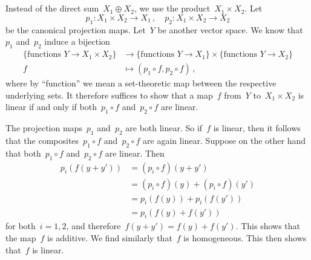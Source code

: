\subsection{}

Instead of the direct sum~$X_1 ⊕ X_2$, we use the product~$X_1 × X_2$.
Let
\[
	p_1 \colon X_1 × X_2 \to X_1 \,,
	\quad
	p_2 \colon X_1 × X_2 \to X_2
\]
be the canonical projection maps.
Let~$Y$ be another vector space.
We know that~$p_1$ and~$p_2$ induce a bijection
\begin{align*}
	\{ \text{functions~$\textstyle Y \to X_1 × X_2$} \}
	&\to
	\{ \text{functions~$\textstyle Y \to X_1$} \}
	×
	\{ \text{functions~$\textstyle Y \to X_2$} \}
	\\
	f
	&\mapsto
	(p_1 ∘ f, p_2 ∘ f) \,,
\end{align*}
where by \enquote{function} we mean a set-theoretic map between the respective underlying sets.
It therefore suffices to show that a map~$f$ from~$Y$ to~$X_1 × X_2$ is linear if and only if both~$p_1 ∘ f$ and~$p_2 ∘ f$ are linear.

The projection maps~$p_1$ and~$p_2$ are both linear.
So if~$f$ is linear, then it follows that the composites~$p_1 ∘ f$ and~$p_2 ∘ f$ are again linear.
Suppose on the other hand that both~$p_1 ∘ f$ and~$p_2 ∘ f$ are linear.
Then
\begin{align*}
	p_i(f(y + y'))
	&=
	(p_i ∘ f)(y + y')
	\\
	&=
	(p_i ∘ f)(y) + (p_i ∘ f)(y')
	\\
	&=
	p_i(f(y)) + p_i(f(y'))
	\\
	&=
	p_i( f(y) + f(y') )
\end{align*}
for both~$i = 1, 2$, and therefore~$f(y + y') = f(y) + f(y')$.
This shows that the map~$f$ is additive.
We find similarly that~$f$ is homogeneous.
This then shows that~$f$ is linear.
